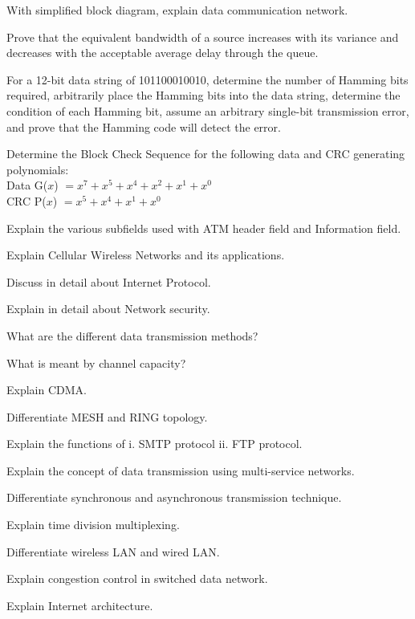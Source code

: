 \markB
\partC

\item \iitem With simplified block diagram, explain data communication network.

\newpage \again

\Or
\item Prove that the equivalent bandwidth of a source increases with its variance
  and decreases with the acceptable average delay through the queue.
\ene

\item \iitem For a 12-bit data string of 101100010010, determine the number of Hamming
  bits required, arbitrarily place the Hamming bits into the data string, determine the
  condition of each Hamming bit, assume an arbitrary single-bit transmission error,
  and prove that the Hamming code will detect the error.
\Or
\item Determine the Block Check Sequence for the following data and CRC generating
  polynomials:\\
  Data G($x$) $= x^7 + x^5 + x^4 + x^2 + x^1 + x^0$\\
  CRC P($x$) $=  x^5 + x^4 + x^1 + x^0$
\ene

\item \iitem Explain the various subfields used with ATM header field and Information
  field.
\Or
\item Explain Cellular Wireless Networks and its applications.
\ene

\item \iitem Discuss in detail about Internet Protocol.
\Or
\item Explain in detail about Network security.
\ene

\markC
\ene

\newpage

\sub{\subj}
\maxtime

\partA

\iitem What are the different data transmission methods?
\item What is meant by channel capacity?
\item Explain CDMA.
\item Differentiate MESH and RING topology.
\item Explain the functions of i. SMTP protocol ii. FTP protocol.

\markA
\partB

\item Explain the concept of data transmission using multi-service networks.
\item Differentiate synchronous and asynchronous transmission technique.
\item Explain time division multiplexing.
\item Differentiate wireless LAN and wired LAN.
\item Explain congestion control in switched data network.
\item Explain Internet architecture.

